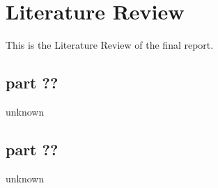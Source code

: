 \section{Literature Review} 
This is the Literature Review of the final report.
\subsection{part ??}
unknown
\subsection{part ??}
unknown

\newpage